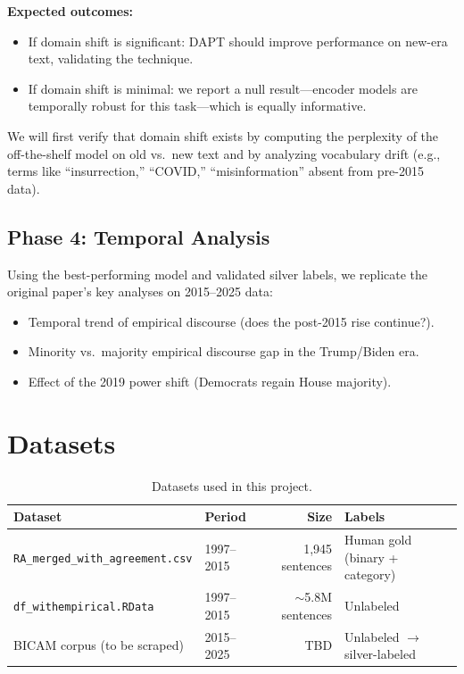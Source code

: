 \documentclass[11pt,a4paper]{article}
\begin{document}
\textbf{Expected outcomes:}
\begin{itemize}[nosep]
  \item If domain shift is significant: DAPT should improve performance on new-era text, validating the technique.
  \item If domain shift is minimal: we report a null result---encoder models are temporally robust for this task---which is equally informative.
\end{itemize}

We will first verify that domain shift exists by computing the perplexity of the off-the-shelf model on old vs.\ new text and by analyzing vocabulary drift (e.g., terms like ``insurrection,'' ``COVID,'' ``misinformation'' absent from pre-2015 data).

\subsection{Phase 4: Temporal Analysis}

Using the best-performing model and validated silver labels, we replicate the original paper's key analyses on 2015--2025 data:
\begin{itemize}[nosep]
  \item Temporal trend of empirical discourse (does the post-2015 rise continue?).
  \item Minority vs.\ majority empirical discourse gap in the Trump/Biden era.
  \item Effect of the 2019 power shift (Democrats regain House majority).
\end{itemize}

\section{Datasets}

\begin{table}[h]
\centering
\small
\begin{tabular}{@{}llrl@{}}
\toprule
\textbf{Dataset} & \textbf{Period} & \textbf{Size} & \textbf{Labels} \\
\midrule
\texttt{RA\_merged\_with\_agreement.csv} & 1997--2015 & 1,945 sentences & Human gold (binary + category) \\
\texttt{df\_withempirical.RData} & 1997--2015 & $\sim$5.8M sentences & Unlabeled \\
BICAM corpus (to be scraped) & 2015--2025 & TBD & Unlabeled $\to$ silver-labeled \\
\bottomrule
\end{tabular}
\caption{Datasets used in this project.}
\end{table}
\end{document}
